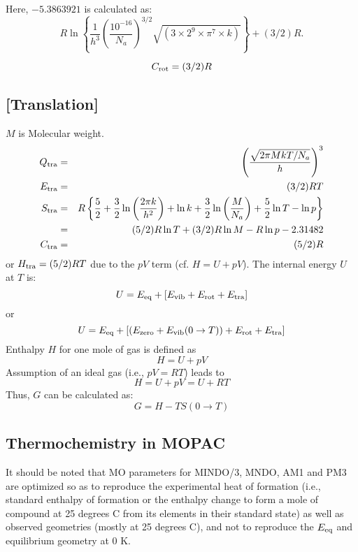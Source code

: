 Here, $-5.386 3921$ is calculated as:
$$ R \ln\left\{\frac{1}{h^3} \left(\frac{10^{-16}}{N_a}\right)^{3/2} 
\sqrt{(3\times 2^9 \times \pi^7 \times k)}\right\} + (3/2)R.
$$

\begin{equation}
C_{\rm rot} = (3/2)R \label{eq18}
\end{equation}

\subsection*{[Translation]}
$M$ is Molecular weight.
\begin{eqnarray}
Q_{\rm tra} & = & \left( \frac{\sqrt{2\pi MkT/N_a}}{h}\right)^3
\label{eq19} \\
E_{\rm tra} & = & (3/2)RT                            \label{eq20} \\
S_{\rm tra} & = & R\left\{ \frac{5}{2} + 
\frac{3}{2}\ln\left(\frac{2\pi k}{h^2}\right) + \ln k + 
\frac{3}{2}\ln\left(\frac{M}{N_a}\right) + \frac{5}{2}\ln T - \ln p \right\}
\label{eq21} \\
            & = & (5/2)R\ln T + (3/2)R\ln M - R\ln p - 2.31482 \label{eq22}\\
C_{\rm tra} & = & (5/2)R                              \label{eq23}
\end{eqnarray}
or  $H_{\rm tra} = (5/2)RT$  due to the $pV$ term (cf.  $H = U + pV$).
The internal energy $U$ at $T$ is:
\begin{equation}
U = E_{\rm eq} + [E_{\rm vib} + E_{\rm rot} + E_{\rm tra}] \label{eq24}
\end{equation}
or
\begin{equation}
U = E_{\rm eq} + [(E_{\rm zero} + E_{\rm vib}(0\rightarrow T)) 
  + E_{\rm rot} + E_{\rm tra}]  \label{eq25}
\end{equation}
Enthalpy $H$ for one mole of gas is defined as
\begin{equation}
H = U + pV     \label{eq26}
\end{equation}
Assumption of an ideal gas (i.e.,  $pV = RT$) leads to
\begin{equation}
H = U + pV = U + RT  \label{eq27} 
\end{equation}
Thus,  $G$ can be calculated as:
\begin{equation}
           G = H - T S(0\rightarrow T) \label{eq28}
\end{equation}

\subsection*{Thermochemistry in MOPAC}
It should be noted that MO parameters for MINDO/3,  MNDO,  AM1  and
PM3  are optimized so as to reproduce the experimental heat of formation
(i.e., standard enthalpy of formation or the enthalpy change to  form  a
mole  of  compound  at  25 degrees C from its elements in their standard
state) as well as observed geometries (mostly at 25 degrees C), and  not
to reproduce the $E_{\rm eq}$ and equilibrium geometry at 0 K.


